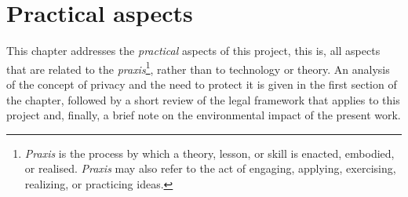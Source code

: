 \chapter{Practical aspects} %
\label{Chapter4PracticalAspects} %


This chapter addresses the \textit{practical} aspects of this project, this is, all aspects that are related to the \textit{praxis}\footnote{\textit{Praxis} is the process by which a theory, lesson, or skill is enacted, embodied, or realised. \textit{Praxis} may also refer to the act of engaging, applying, exercising, realizing, or practicing ideas.}, rather than to technology or theory. An analysis of the concept of privacy and the need to protect it is given in the first section of the chapter, followed by a short review of the legal framework that applies to this project and, finally, a brief note on the environmental impact of the present work.




